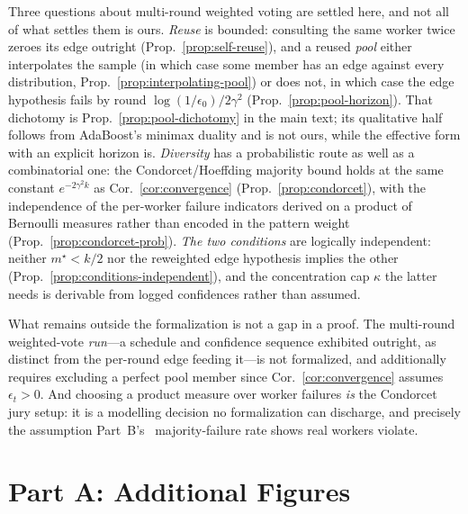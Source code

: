 Three questions about multi-round weighted voting are settled here, and not all of what settles them is ours. \emph{Reuse} is bounded: consulting the same worker twice zeroes its edge outright (Prop.~\ref{prop:self-reuse}), and a reused \emph{pool} either interpolates the sample (in which case some member has an edge against every distribution, Prop.~\ref{prop:interpolating-pool}) or does not, in which case the edge hypothesis fails by round $\log(1/\epsilon_0)/2\gamma^2$ (Prop.~\ref{prop:pool-horizon}). That dichotomy is Prop.~\ref{prop:pool-dichotomy} in the main text; its qualitative half follows from AdaBoost's minimax duality and is not ours, while the effective form with an explicit horizon is. \emph{Diversity} has a probabilistic route as well as a combinatorial one: the Condorcet/Hoeffding majority bound holds at the same constant $e^{-2\gamma^2k}$ as Cor.~\ref{cor:convergence} (Prop.~\ref{prop:condorcet}), with the independence of the per-worker failure indicators derived on a product of Bernoulli measures rather than encoded in the pattern weight (Prop.~\ref{prop:condorcet-prob}). \emph{The two conditions} are logically independent: neither $m^\star{<}k/2$ nor the reweighted edge hypothesis implies the other (Prop.~\ref{prop:conditions-independent}), and the concentration cap $\kappa$ the latter needs is derivable from logged confidences rather than assumed.

What remains outside the formalization is not a gap in a proof. The multi-round weighted-vote \emph{run}---a schedule and confidence sequence exhibited outright, as distinct from the per-round edge feeding it---is not formalized, and additionally requires excluding a perfect pool member since Cor.~\ref{cor:convergence} assumes $\epsilon_t>0$. And choosing a product measure over worker failures \emph{is} the Condorcet jury setup: it is a modelling decision no formalization can discharge, and precisely the assumption Part~B's \statPBOverlapViolate\ majority-failure rate shows real workers violate.

\section{Part A: Additional Figures}
\label{app:parta}

